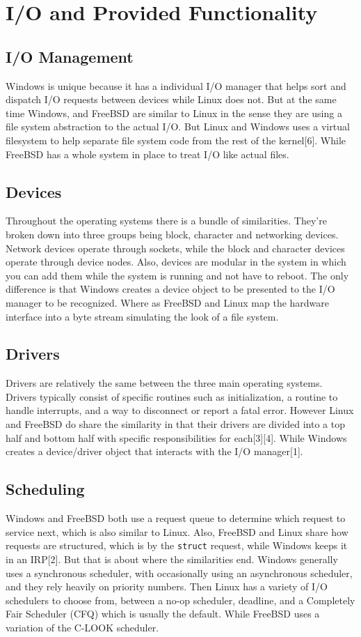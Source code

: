 \documentclass{article}
\begin{document}
\section{I/O and Provided Functionality}
\subsection{I/O Management}
	Windows is unique because it has a individual I/O manager that helps sort and dispatch I/O requests between devices while Linux does not. But at the same time Windows, and  FreeBSD are similar to Linux in the sense they are using a file system abstraction to the actual I/O. But Linux and Windows uses a virtual filesystem to help separate file system code from the rest of the kernel[6]. While FreeBSD has a whole system in place to treat I/O like actual files.
\subsection{Devices}
    Throughout the operating systems there is a bundle of similarities. They’re broken down into three groups being block, character and networking devices. Network devices operate through sockets, while the block and character devices operate through device nodes. Also, devices are modular in the system in which you can add them while the system is running and not have to reboot. The only difference is that Windows creates a device object to be presented to the I/O manager to be recognized. Where as FreeBSD and Linux map the hardware interface into a byte stream simulating the look of a file system.

\subsection{Drivers}
	Drivers are relatively the same between the three main operating systems. Drivers typically consist of specific routines such as initialization, a routine to handle interrupts, and a way to disconnect or report a fatal error. However Linux and FreeBSD do share the similarity in that their drivers are divided into a top half and bottom half with specific responsibilities for each[3][4]. While Windows creates a device/driver object that interacts with the I/O manager[1].
\subsection{Scheduling}
	Windows and FreeBSD both use a request queue to determine which request to service next, which is also similar to Linux. Also, FreeBSD and Linux share how requests are structured, which is by the \texttt{struct} request, while Windows keeps it in an IRP[2]. But that is about where the similarities end. Windows generally uses a synchronous scheduler, with occasionally using an asynchronous scheduler, and they rely heavily on priority numbers. Then Linux has a variety of I/O schedulers to choose from, between a no-op scheduler, deadline, and a Completely Fair Scheduler (CFQ) which is usually the default. While FreeBSD uses a variation of the C-LOOK scheduler.
\end{document}
